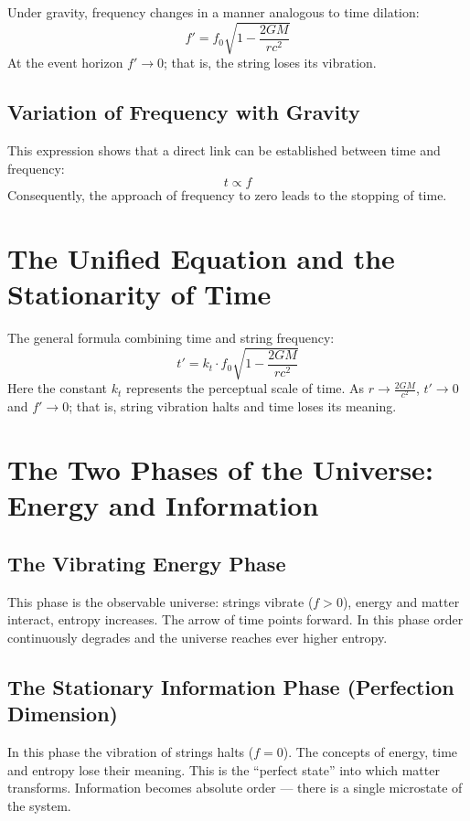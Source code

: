 \documentclass[12pt,a4paper]{article}
\begin{document}
Under gravity, frequency changes in a manner analogous to time dilation:
\begin{equation}
f' = f_0 \sqrt{1 - \frac{2GM}{r c^2}}
\end{equation}
At the event horizon $f' \to 0$; that is, the string loses its vibration.

\subsection{Variation of Frequency with Gravity}
This expression shows that a direct link can be established between time and frequency:
\begin{equation}
t \propto f
\end{equation}
Consequently, the approach of frequency to zero leads to the stopping of time.

\section{The Unified Equation and the Stationarity of Time}
The general formula combining time and string frequency:
\begin{equation}
t' = k_t \cdot f_0 \sqrt{1 - \frac{2GM}{r c^2}}
\end{equation}
Here the constant $k_t$ represents the perceptual scale of time.
As $r \to \frac{2GM}{c^2}$, $t' \to 0$ and $f' \to 0$;
that is, string vibration halts and time loses its meaning.

\section{The Two Phases of the Universe: Energy and Information}

\subsection{The Vibrating Energy Phase}
This phase is the observable universe: strings vibrate ($f > 0$), energy and matter interact, entropy increases.
The arrow of time points forward.
In this phase order continuously degrades and the universe reaches ever higher entropy.

\subsection{The Stationary Information Phase (Perfection Dimension)}
In this phase the vibration of strings halts ($f = 0$).
The concepts of energy, time and entropy lose their meaning.
This is the ``perfect state'' into which matter transforms.
Information becomes absolute order --- there is a single microstate of the system.
\end{document}
